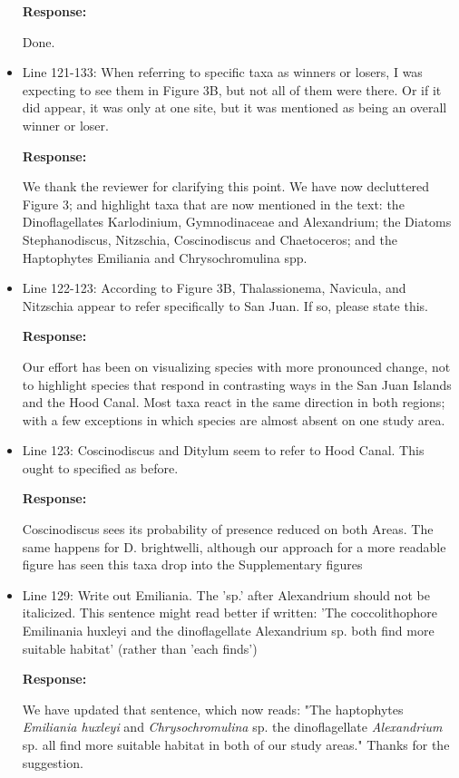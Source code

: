 \documentclass[11pt]{article}
\begin{document}
\begin{linenumbers}
\begin{itemize}
\textbf{Response:}

Done.

\item{Line 121-133: When referring to specific taxa as winners or losers, I was expecting to see them in Figure 3B, but not all of them were there. Or if it did appear, it was only at one site, but it was mentioned as being an overall winner or loser.}

\textbf{Response:}

 We thank the reviewer for clarifying this point. We have now decluttered Figure 3; and highlight taxa that are now mentioned in the text: the Dinoflagellates Karlodinium, Gymnodinaceae and Alexandrium; the Diatoms Stephanodiscus, Nitzschia, Coscinodiscus and Chaetoceros; and the Haptophytes Emiliania and Chrysochromulina spp.

\item{Line 122-123: According to Figure 3B, Thalassionema, Navicula, and Nitzschia appear to refer specifically to San Juan. If so, please state this.}

\textbf{Response:}

Our effort has been on visualizing species with more pronounced change, not to highlight species that respond in contrasting ways in the San Juan Islands and the Hood Canal. Most taxa react in the same direction in both regions; with a few exceptions in which species are almost absent on one study area. 


\item{Line 123: Coscinodiscus and Ditylum seem to refer to Hood Canal. This ought to specified as before.}

\textbf{Response:}

Coscinodiscus sees its probability of presence reduced on both Areas. The same happens for D. brightwelli, although our approach for a more readable figure has seen this taxa drop into the Supplementary figures


\item{Line 129: Write out Emiliania. The 'sp.' after Alexandrium should not be italicized. This sentence might read better if written: 'The coccolithophore Emilinania huxleyi and the dinoflagellate Alexandrium sp. both find more suitable habitat' (rather than 'each finds')}

\textbf{Response:}

 We have updated that sentence, which now reads: "The haptophytes \textit{Emiliania huxleyi} and \textit{Chrysochromulina} sp. the dinoflagellate \textit{Alexandrium} sp. all find more suitable habitat in both of our study areas." Thanks for the suggestion. 


\end{itemize}
\end{linenumbers}
\end{document}
